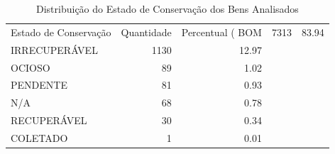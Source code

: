 \begin{table}
\caption{Distribuição do Estado de Conservação dos Bens Analisados}
\label{tab:estado_conservacao}
\begin{tabular}{lrr}
\toprule
Estado de Conservação & Quantidade & Percentual (%
\midrule
BOM & 7313 & 83.94 \\
IRRECUPERÁVEL & 1130 & 12.97 \\
OCIOSO & 89 & 1.02 \\
PENDENTE & 81 & 0.93 \\
N/A & 68 & 0.78 \\
RECUPERÁVEL & 30 & 0.34 \\
COLETADO & 1 & 0.01 \\
\bottomrule
\end{tabular}
\end{table}
